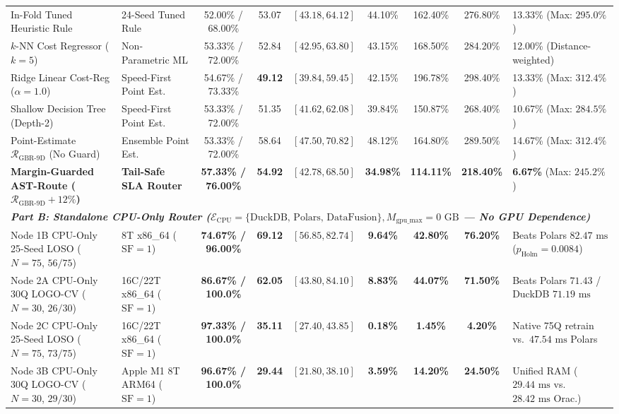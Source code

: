 \documentclass[10pt,a4paper]{article}
\newenvironment{fitasttable}{%
  \begin{lrbox}{\asttblbox}%
}{%
  \end{lrbox}%
  \sbox{\asttblboxB}{%
    \ifdim\wd\asttblbox>0.96\textwidth
      \resizebox{0.96\textwidth}{!}{\usebox{\asttblbox}}%
    \else
      \usebox{\asttblbox}%
    \fi
  }%
  \ifdim\ht\asttblboxB>0.78\textheight
    \resizebox{!}{0.78\textheight}{\usebox{\asttblboxB}}%
  \else
    \usebox{\asttblboxB}%
  \fi
}
\begin{document}
\begin{table}[t!]
\begin{fitasttable}
\begin{tabular}{@{}llccccccl@{}}
In-Fold Tuned Heuristic Rule & 24-Seed Tuned Rule & 52.00\% / 68.00\% & 53.07 & $[43.18, 64.12]$ & 44.10\% & 162.40\% & 276.80\% & 13.33\% (Max: $295.0\%$) \\
$k$-NN Cost Regressor ($k=5$) & Non-Parametric ML & 53.33\% / 72.00\% & 52.84 & $[42.95, 63.80]$ & 43.15\% & 168.50\% & 284.20\% & 12.00\% (Distance-weighted) \\
Ridge Linear Cost-Reg ($\alpha=1.0$) & Speed-First Point Est. & 54.67\% / 73.33\% & \textbf{49.12} & $[39.84, 59.45]$ & 42.15\% & 196.78\% & 298.40\% & 13.33\% (Max: $312.4\%$) \\
Shallow Decision Tree (Depth-2) & Speed-First Point Est. & 53.33\% / 72.00\% & 51.35 & $[41.62, 62.08]$ & 39.84\% & 150.87\% & 268.40\% & 10.67\% (Max: $284.5\%$) \\
Point-Estimate $\mathcal{R}_{\text{GBR-9D}}$ (No Guard) & Ensemble Point Est. & 53.33\% / 72.00\% & 58.64 & $[47.50, 70.82]$ & 48.12\% & 164.80\% & 289.50\% & 14.67\% (Max: $312.4\%$) \\
\textbf{Margin-Guarded AST-Route ($\mathcal{R}_{\text{GBR-9D}}+12\%$)} & \textbf{Tail-Safe SLA Router} & \textbf{57.33\% / 76.00\%} & \textbf{54.92} & $[42.78, 68.50]$ & \textbf{34.98\%} & \textbf{114.11\%} & \textbf{218.40\%} & \textbf{6.67\%} (Max: $245.2\%$) \\
\hline
\multicolumn{9}{l}{\textit{\textbf{Part B: Standalone CPU-Only Router ($\mathcal{E}_{\text{CPU}}=\{\text{DuckDB, Polars, DataFusion}\}, M_{\text{gpu\_max}}=0\text{ GB}$ --- No GPU Dependence)}}} \\
Node 1B CPU-Only 25-Seed LOSO ($N=75$, $56/75$) & 8T x86\_64 ($\text{SF}=1$) & \textbf{74.67\% / 96.00\%} & \textbf{69.12} & $[56.85, 82.74]$ & \textbf{9.64\%} & \textbf{42.80\%} & \textbf{76.20\%} & Beats Polars $82.47\text{ ms}$ ($p_{\text{Holm}}=0.0084$) \\
Node 2A CPU-Only 30Q LOGO-CV ($N=30$, $26/30$) & 16C/22T x86\_64 ($\text{SF}=1$) & \textbf{86.67\% / 100.0\%} & \textbf{62.05} & $[43.80, 84.10]$ & \textbf{8.83\%} & \textbf{44.07\%} & \textbf{71.50\%} & Beats Polars $71.43$ / DuckDB $71.19\text{ ms}$ \\
Node 2C CPU-Only 25-Seed LOSO ($N=75$, $73/75$) & 16C/22T x86\_64 ($\text{SF}=1$) & \textbf{97.33\% / 100.0\%} & \textbf{35.11} & $[27.40, 43.85]$ & \textbf{0.18\%} & \textbf{1.45\%} & \textbf{4.20\%} & Native 75Q retrain vs.\ $47.54\text{ ms}$ Polars \\
Node 3B CPU-Only 30Q LOGO-CV ($N=30$, $29/30$) & Apple M1 8T ARM64 ($\text{SF}=1$) & \textbf{96.67\% / 100.0\%} & \textbf{29.44} & $[21.80, 38.10]$ & \textbf{3.59\%} & \textbf{14.20\%} & \textbf{24.50\%} & Unified RAM ($29.44\text{ ms}$ vs.\ $28.42\text{ ms}$ Orac.) \\

\end{tabular}
\end{fitasttable}
\end{table}
\end{document}
